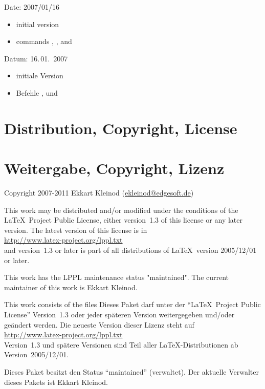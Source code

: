 
\ifENGLISH
	Date: 2007/01/16
	\begin{itemize}
	\item initial version
	\item commands , , and 
	\end{itemize}
\fi
	\ifGERMAN
		Datum: 16.\,01.~2007
		\begin{itemize}
		\item initiale Version
		\item Befehle ,  und 
		\end{itemize}
	\fi

\ifENGLISH
	\section{Distribution, Copyright, License}
\fi
	\ifGERMAN
		\section{Weitergabe, Copyright, Lizenz}
	\fi

Copyright 2007-2011 Ekkart Kleinod (\href{mailto:ekleinod@edgesoft.de}{ekleinod@edgesoft.de})

\ifENGLISH
	This work may be distributed and/or modified under the
	conditions of the \LaTeX\ Project Public License, either version~1.3
	of this license or any later version.
	The latest version of this license is in\\
	\url{http://www.latex-project.org/lppl.txt}\\
	and version~1.3 or later is part of all distributions of \LaTeX\
	version 2005/12/01 or later.

	This work has the LPPL maintenance status "maintained".
	The current maintainer of this work is Ekkart Kleinod.

	This work consists of the files
\fi
	\ifGERMAN
		Dieses Paket darf unter der "`\LaTeX\ Project Public License"' Version~1.3 oder jeder späteren Version weitergegeben und/oder geändert werden.
		Die neueste Version dieser Lizenz steht auf\\
		\url{http://www.latex-project.org/lppl.txt}\\
		Version~1.3 und spätere Versionen sind Teil aller \LaTeX-Distributionen ab Version~2005/12/01.

		Dieses Paket besitzt den Status "`maintained"' (verwaltet).
		Der aktuelle Verwalter dieses Pakets ist Ekkart Kleinod.

